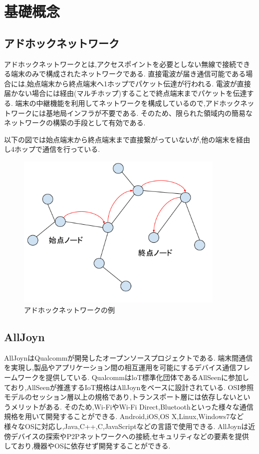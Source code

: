 \chapter{基礎概念}
\label{chap:concept}

\section{アドホックネットワーク}
アドホックネットワーク\cite{アドホック}とは,アクセスポイントを必要としない無線で接続できる端末のみで構成されたネットワークである.
直接電波が届き通信可能である場合には,始点端末から終点端末へ1ホップでパケット伝達が行われる.
電波が直接届かない場合には経由(マルチホップ)することで終点端末までパケットを伝達する.
端末の中継機能を利用してネットワークを構成しているので,アドホックネットワークには基地局インフラが不要である.
そのため、限られた領域内の簡易なネットワークの構築の手段として有効である.

以下の図では始点端末から終点端末まで直接繋がっていないが,他の端末を経由し4ホップで通信を行っている.

\begin{figure}[htbp]
\centering
\includegraphics[width=10cm]{fig/ad-hoc.pdf}
\caption{アドホックネットワークの例}
\end{figure}

\section{AllJoyn}
AllJoyn\cite{allseen}\cite{スライド}はQualcommが開発したオープンソースプロジェクトである.
端末間通信を実現し,製品やアプリケーション間の相互運用を可能にするデバイス通信フレームワークを提供している.
QualcommはloT標準化団体であるAllSeenに参加しており,AllSeenが推進するIoT規格はAllJoynをベースに設計されている.
OSI参照モデルのセッション層以上の規格であり,トランスポート層には依存しないというメリットがある.
そのため,Wi-FiやWi-Fi Direct,Bluetoothといった様々な通信規格を用いて開発することができる.
Android,iOS,OS X,Linux,Windows7など様々なOSに対応し,Java,C++,C,JavaScriptなどの言語で使用できる.
AllJoynは近傍デバイスの探索やP2Pネットワークへの接続,セキュリティなどの要素を提供しており,機器やOSに依存せず開発することができる.

